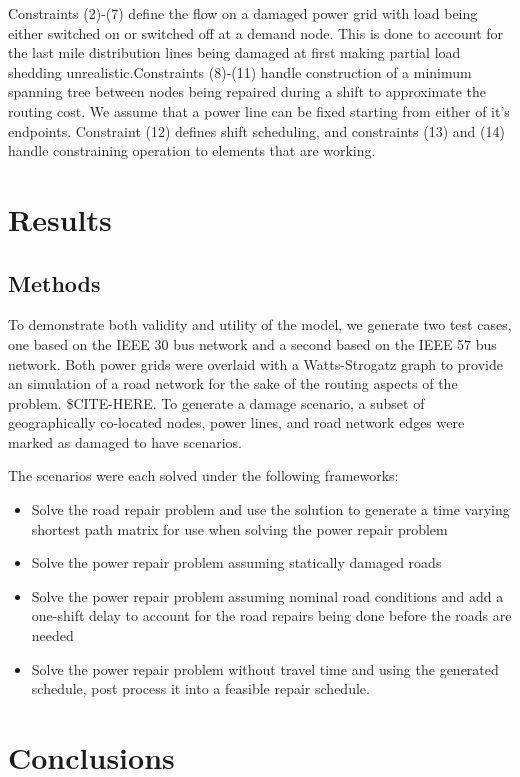 \documentclass[10pt]{article}
\begin{document}
 Constraints (2)-(7) define the flow on a damaged power grid with load being either switched on or switched off at a demand node. This is done to account for the last mile distribution lines being damaged at first making partial load shedding unrealistic.Constraints (8)-(11) handle construction of a minimum spanning tree between nodes being repaired during a shift to approximate the routing cost. We assume that a power line can be fixed starting from either of it's endpoints. Constraint (12) defines shift scheduling, and constraints (13) and (14) handle constraining operation to elements that are working.
\section{\large{Results}}
\vspace*{-12pt}
\subsection{Methods}
 \vspace*{-12pt}
 
 To demonstrate both validity and utility of the model, we generate two test cases, one based on the IEEE 30 bus network and a second based on the IEEE 57 bus network. Both power grids were overlaid with a Watts-Strogatz graph to provide an simulation of a road network for the sake of the routing aspects of the problem. \$CITE-HERE. To generate a damage scenario, a subset of geographically co-located nodes, power lines, and road network edges were marked as damaged to have scenarios.
 
 The scenarios were each solved under the following frameworks:
 \begin{itemize}
 	\item Solve the road repair problem and use the solution to generate a time varying shortest path matrix for use when solving the power repair problem
 	\item Solve the power repair problem assuming statically damaged roads
 	\item Solve the power repair problem assuming nominal road conditions and add a one-shift delay to account for the road repairs being done before the roads are needed
 	\item Solve the power repair problem without travel time and using the generated schedule, post process it into a feasible repair schedule.
 \end{itemize}


\section{\large{Conclusions}}
\label{sec:issues}
\vspace*{-12pt}



\end{document}
